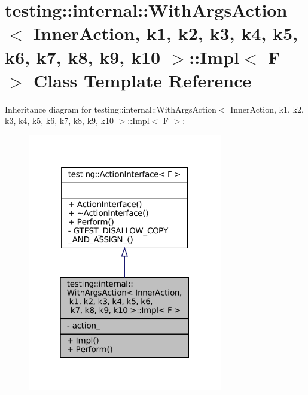 \hypertarget{classtesting_1_1internal_1_1WithArgsAction_1_1Impl}{}\section{testing\+:\+:internal\+:\+:With\+Args\+Action$<$ Inner\+Action, k1, k2, k3, k4, k5, k6, k7, k8, k9, k10 $>$\+:\+:Impl$<$ F $>$ Class Template Reference}
\label{classtesting_1_1internal_1_1WithArgsAction_1_1Impl}


Inheritance diagram for testing\+:\+:internal\+:\+:With\+Args\+Action$<$ Inner\+Action, k1, k2, k3, k4, k5, k6, k7, k8, k9, k10 $>$\+:\+:Impl$<$ F $>$\+:
\nopagebreak
\begin{figure}[H]
\begin{center}
\leavevmode
\includegraphics[width=241pt]{classtesting_1_1internal_1_1WithArgsAction_1_1Impl__inherit__graph}
\end{center}
\end{figure}


